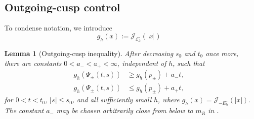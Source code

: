 \documentclass[11pt]{article}
\newtheorem{lemma}[theorem]{Lemma}
\newcommand{\cE}{\mathcal E}
\newcommand{\cJ}{\mathcal J}
\begin{document}
\subsection{Outgoing-cusp control}\label{sec:outgoing-cusp}
To condense notation, we introduce
\[
g_h(x) := \cJ_{\cE^\circ_h}(|x|)
\]
\begin{lemma}[Outgoing-cusp inequality]\label{lem:outgoing-cusp}
After decreasing $s_0$ and $t_0$ once more, there are constants
$0<a_-<a_+<\infty$, independent of $h$, such that
\begin{align}
 g_h(\Psi_\pm(t,s))&\ge g_h(p_\pm)+a_-t,\label{eq:cusp-growth-master}\\
 g_h(\Psi_\pm(t,s))&\le g_h(p_\pm)+a_+t,
 \label{eq:cusp-growth-upper}
\end{align}
for $0<t<t_0$, $|s|\le s_0$, and all sufficiently small $h$, where
$g_h(x)=\cJ_{-E_h^\circ}(|x|)$.  The constant $a_-$ may be chosen
arbitrarily close from below to $m_R$ in .
\end{lemma}
\end{document}
